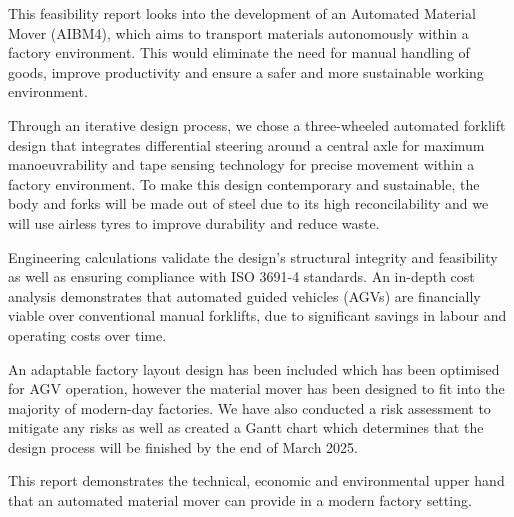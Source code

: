 \documentclass[12pt,titlepage]{article}
\begin{document}
This feasibility report looks into the development of an Automated Material Mover (AIBM4), which aims to transport materials autonomously within a factory environment. This would eliminate the need for manual handling of goods, improve productivity and ensure a safer and more sustainable working environment. 
\par Through an iterative design process, we chose a three-wheeled automated forklift design that integrates differential steering around a central axle for maximum manoeuvrability and tape sensing technology for precise movement within a factory environment. To make this design contemporary and sustainable, the body and forks will be made out of steel due to its high reconcilability and we will use airless tyres to improve durability and reduce waste.
\par Engineering calculations validate the design's structural integrity and feasibility as well as ensuring compliance with ISO 3691-4  standards. An in-depth cost analysis demonstrates that automated guided vehicles (AGVs) are financially viable over conventional manual forklifts, due to significant savings in labour and operating costs over time. 
\par An adaptable factory layout design has been included which has been optimised for AGV operation, however the material mover has been designed to fit into the majority of modern-day factories. We have also conducted a risk assessment to mitigate any risks as well as created a Gantt chart which determines that the design process will be finished by the end of March 2025.
\par This report demonstrates the technical, economic and environmental upper hand that an automated material mover can provide in a modern factory setting.

\vspace{2em}

\tableofcontents



\end{document}
